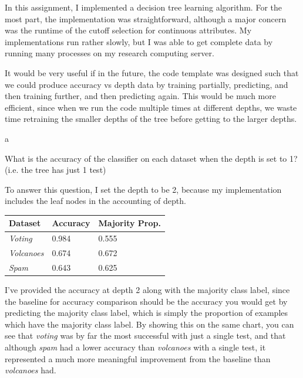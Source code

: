 \documentclass[fleqn]{homework}
\begin{document}
  \maketitle

  In this assignment, I implemented a decision tree learning algorithm.  For the
  most part, the implementation was straightforward, although a major concern
  was the runtime of the cutoff selection for continuous attributes.  My
  implementations run rather slowly, but I was able to get complete data by
  running many processes on my research computing server.

  It would be very useful if in the future, the code template was designed such
  that we could produce accuracy vs depth data by training partially,
  predicting, and then training further, and then predicting again.  This would
  be much more efficient, since when we run the code multiple times at different
  depths, we waste time retraining the smaller depths of the tree before getting
  to the larger depths.

  \begin{problem}{a}
    \begin{question}
      What is the accuracy of the classifier on each dataset when the depth is
      set to 1? (i.e. the tree has just 1 test)
    \end{question}
    To answer this question, I set the depth to be 2, because my implementation
    includes the leaf nodes in the accounting of depth.

    \begin{tabular}{lll}
      \textbf{Dataset} & \textbf{Accuracy} & \textbf{Majority Prop.} \\
      \hline
      \textit{Voting} & 0.984 & 0.555 \\
      \textit{Volcanoes} & 0.674 & 0.672 \\
      \textit{Spam} & 0.643 & 0.625 \\
    \end{tabular}

    I've provided the accuracy at depth 2 along with the majority class label,
    since the baseline for accuracy comparison should be the accuracy you would
    get by predicting the majority class label, which is simply the proportion
    of examples which have the majority class label.  By showing this on the
    same chart, you can see that \textit{voting} was by far the most successful
    with just a single test, and that although \textit{spam} had a lower
    accuracy than \textit{volcanoes} with a single test, it represented a much
    more meaningful improvement from the baseline than \textit{volcanoes} had.
  \end{problem}
\end{document}
